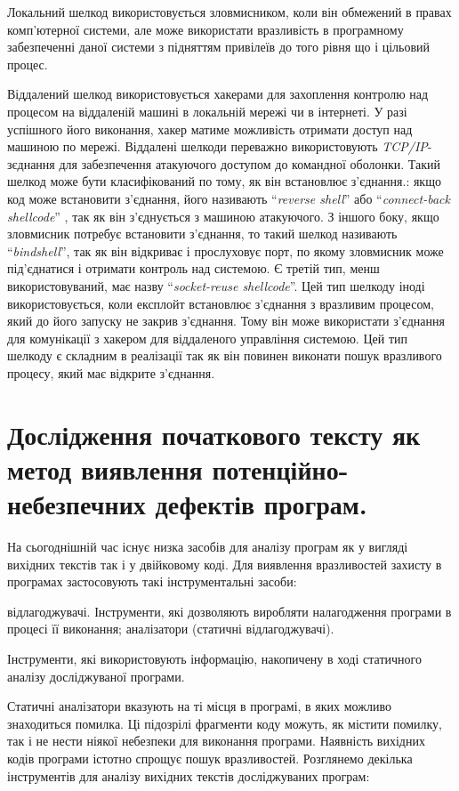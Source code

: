 Локальний шелкод використовується зловмисником, коли він обмежений в правах комп’ютерної системи, але може використати вразливість в програмному забезпеченні даної системи з підняттям привілеїв до того рівня що і цільовий процес.

Віддалений шелкод використовується хакерами для захоплення контролю над процесом на віддаленій машині в локальній мережі чи в інтернеті. У разі успішного його виконання, хакер матиме можливість отримати доступ над машиною по мережі. Віддалені шелкоди переважно використовують  {\it TCP/IP}-зєднання для забезпечення атакуючого доступом до командної оболонки. Такий шелкод може бути класифікований по тому, як він встановлює з’єднання.: якщо код може встановити з’єднання, його називають ``{\it reverse shell}'' або “{\it connect-back shellcode}”
, так як він з’єднується з машиною атакуючого. З іншого боку, якщо зловмисник потребує встановити з’єднання, то такий шелкод називають “{\it  bindshell}”, так як він відкриває і прослуховує порт, по якому зловмисник може під’єднатися і отримати контроль над системою. Є третій тип, менш використовуваний, має назву “{\it socket-reuse shellcode}”. Цей тип шелкоду іноді використовується, коли експлойт встановлює з’єднання з вразливим процесом, який до його запуску не закрив з’єднання. Тому він може використати з’єднання для комунікації з хакером для віддаленого управління системою. Цей тип шелкоду є складним в реалізації так як він повинен виконати пошук вразливого процесу, який має відкрите з’єднання.

\pagebreak

\section{Дослідження початкового тексту як метод виявлення потенційно-небезпечних дефектів програм.}
\label{1section:id3}
На сьогоднішній час існує низка засобів для аналізу програм як у вигляді вихідних текстів так і у двійковому коді.
Для виявлення вразливостей захисту в програмах застосовують такі інструментальні засоби:
\begin{itemize}
 відлагоджувачі. Інструменти, які дозволяють виробляти налагодження програми в процесі її виконання;
 аналізатори (статичні відлагоджувачі).
\end{itemize}

Інструменти, які використовують інформацію, накопичену в ході статичного аналізу досліджуваної програми.

Статичні аналізатори вказують на ті місця в програмі, в яких можливо знаходиться помилка. Ці підозрілі фрагменти коду можуть, як містити помилку, так і не нести ніякої небезпеки для виконання програми. Наявність вихідних кодів програми істотно спрощує пошук вразливостей.
Розглянемо декілька інструментів для аналізу вихідних текстів досліджуваних програм:

